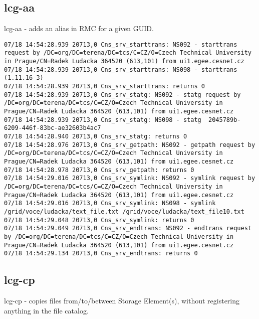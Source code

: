 \documentclass[a4paper, 11pt]{article} %
\begin{document}
\newpage

\subsection{lcg-aa}

lcg-aa - adds an alias in RMC for a given GUID.

\begin{lstlisting}[label={log:aa1},caption={lcg-aa --vo voce guid:2045789b-6209-446f-83bc-ae32603b4ac7 /grid/voce/ludacka/text\_file10.txt}]
07/18 14:54:28.939 20713,0 Cns_srv_starttrans: NS092 - starttrans request by /DC=org/DC=terena/DC=tcs/C=CZ/O=Czech Technical University in Prague/CN=Radek Ludacka 364520 (613,101) from ui1.egee.cesnet.cz
07/18 14:54:28.939 20713,0 Cns_srv_starttrans: NS098 - starttrans (1.11.16-3)
07/18 14:54:28.939 20713,0 Cns_srv_starttrans: returns 0
07/18 14:54:28.939 20713,0 Cns_srv_statg: NS092 - statg request by /DC=org/DC=terena/DC=tcs/C=CZ/O=Czech Technical University in Prague/CN=Radek Ludacka 364520 (613,101) from ui1.egee.cesnet.cz
07/18 14:54:28.939 20713,0 Cns_srv_statg: NS098 - statg  2045789b-6209-446f-83bc-ae32603b4ac7
07/18 14:54:28.940 20713,0 Cns_srv_statg: returns 0
07/18 14:54:28.976 20713,0 Cns_srv_getpath: NS092 - getpath request by /DC=org/DC=terena/DC=tcs/C=CZ/O=Czech Technical University in Prague/CN=Radek Ludacka 364520 (613,101) from ui1.egee.cesnet.cz
07/18 14:54:28.978 20713,0 Cns_srv_getpath: returns 0
07/18 14:54:29.016 20713,0 Cns_srv_symlink: NS092 - symlink request by /DC=org/DC=terena/DC=tcs/C=CZ/O=Czech Technical University in Prague/CN=Radek Ludacka 364520 (613,101) from ui1.egee.cesnet.cz
07/18 14:54:29.016 20713,0 Cns_srv_symlink: NS098 - symlink /grid/voce/ludacka/text_file.txt /grid/voce/ludacka/text_file10.txt
07/18 14:54:29.048 20713,0 Cns_srv_symlink: returns 0
07/18 14:54:29.049 20713,0 Cns_srv_endtrans: NS092 - endtrans request by /DC=org/DC=terena/DC=tcs/C=CZ/O=Czech Technical University in Prague/CN=Radek Ludacka 364520 (613,101) from ui1.egee.cesnet.cz
07/18 14:54:29.134 20713,0 Cns_srv_endtrans: returns 0
\end{lstlisting}
\newpage
\subsection{lcg-cp}

lcg-cp - copies files from/to/between Storage Element(s), without registering anything in the file catalog.
\end{document}
